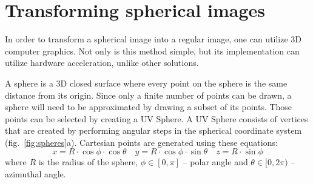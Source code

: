 \documentclass{svproc}
\begin{document}
\section{Transforming spherical images}
\label{sec:spherical}

In order to transform a spherical image into a regular image, one can utilize 3D computer graphics.
Not only is this method simple, but its implementation can utilize hardware acceleration, unlike other solutions. 

A sphere is a 3D closed surface where every point on the sphere is the same distance from its origin.%
Since only a finite number of points can be drawn, a sphere will need to be approximated by drawing a subset of its points.
Those points can be selected by creating a UV Sphere.
A UV Sphere consists of vertices that are created by performing angular steps in the spherical coordinate system (fig.~\ref{fig:spheres}a).
Cartesian points are generated using these equations:
\begin{equation}
    x = R \cdot \cos \phi \cdot \cos \theta \quad y = R \cdot \cos \phi \cdot \sin \theta \quad z = R \cdot \sin \phi \nonumber
\end{equation}
where $R$ is the radius of the sphere, $\phi \in [0, \pi]$ -- polar angle and $\theta \in [0, 2\pi)$ -- azimuthal angle.
\end{document}
